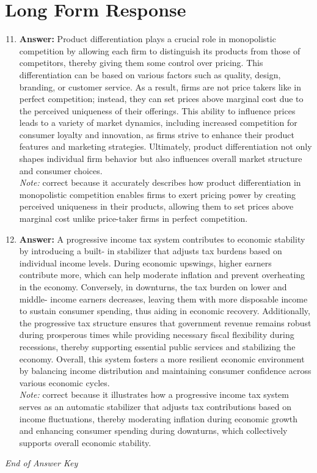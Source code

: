 \documentclass[12pt]{article}
\begin{document}
\section*{Long Form Response}
\begin{enumerate}[label=\arabic*.]
\setcounter{enumi}{10}
\item \textbf{Answer:} Product differentiation plays a crucial role in monopolistic competition by allowing each firm to distinguish its products from those of competitors, thereby giving them some control over pricing. This differentiation can be based on various factors such as quality, design, branding, or customer service. As a result, firms are not price takers like in perfect competition; instead, they can set prices above marginal cost due to the perceived uniqueness of their offerings. This ability to influence prices leads to a variety of market dynamics, including increased competition for consumer loyalty and innovation, as firms strive to enhance their product features and marketing strategies. Ultimately, product differentiation not only shapes individual firm behavior but also influences overall market structure and consumer choices.
\\ \textit{Note:} correct because it accurately describes how product differentiation in monopolistic competition enables firms to exert pricing power by creating perceived uniqueness in their products, allowing them to set prices above marginal cost unlike price-taker firms in perfect competition.
\item \textbf{Answer:} A progressive income tax system contributes to economic stability by introducing a built- in stabilizer that adjusts tax burdens based on individual income levels. During economic upswings, higher earners contribute more, which can help moderate inflation and prevent overheating in the economy. Conversely, in downturns, the tax burden on lower and middle- income earners decreases, leaving them with more disposable income to sustain consumer spending, thus aiding in economic recovery. Additionally, the progressive tax structure ensures that government revenue remains robust during prosperous times while providing necessary fiscal flexibility during recessions, thereby supporting essential public services and stabilizing the economy. Overall, this system fosters a more resilient economic environment by balancing income distribution and maintaining consumer confidence across various economic cycles.
\\ \textit{Note:} correct because it illustrates how a progressive income tax system serves as an automatic stabilizer that adjusts tax contributions based on income fluctuations, thereby moderating inflation during economic growth and enhancing consumer spending during downturns, which collectively supports overall economic stability.
\end{enumerate}

\vfill
\noindent\textit{End of Answer Key}
\end{document}
